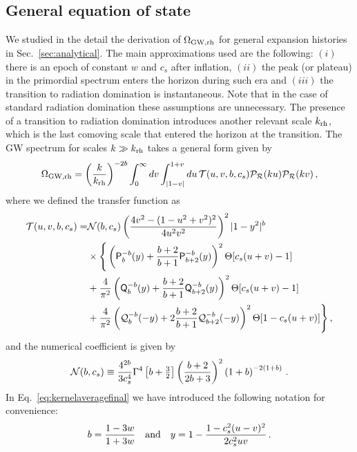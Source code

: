 \documentclass[a4paper,11pt]{article}
\numberwithin{equation}{section}
\begin{document}
\subsection{General equation of state \label{sec:generaleos}}

We studied in the detail the derivation of $\Omega_{\rm GW,rh}$ for general expansion histories in Sec.~\ref{sec:analytical}. The main approximations used are the following: $(i)$ there is an epoch of constant $w$ and $c_s$ after inflation, $(ii)$ the peak (or plateau) in the primordial spectrum enters the horizon during such era and $(iii)$ the transition to radiation domination is instantaneous. Note that in the case of standard radiation domination these assumptions are unnecessary. The presence of a transition to radiation domination introduces another relevant scale $k_{\rm rh}$, which is the last comoving scale that entered the horizon at the transition. The GW spectrum for scales $k\gg k_{\rm rh}$ takes a general form given by
\begin{equation}\label{eq:Phgaussianfinal}
\Omega_{\rm GW,rh}=\left(\frac{k}{k_{\rm rh}}\right)^{-2b}\int_0^\infty dv\int_{|1-v|}^{1+v}du\,{\cal T}(u,v,b,c_s){{\cal P}_{\cal R}(ku)}{{\cal P}_{\cal R}(kv)}\,,
\end{equation}
where we defined the transfer function as
\begin{align}\label{eq:kernelaveragefinal}
{\cal T}(u,v,b,c_s)=& {\cal N}(b,c_s)\left(\frac{4v^2-(1-u^2+v^2)^2}{4u^2v^2}\right)^2{|1-y^2|^{b}}\nonumber\\&
\times\Bigg\{\left(\mathsf{P}^{-b}_{b}(y)+\frac{b+2}{b+1}\mathsf{P}^{-b}_{b+2}(y)\right)^2\Theta[c_s(u+v)-1]\nonumber\\&
+\frac{4}{\pi^2}\left(\mathsf{Q}^{-b}_{b}(y)+\frac{b+2}{b+1}\mathsf{Q}^{-b}_{b+2}(y)\right)^2\Theta[c_s(u+v)-1]\nonumber\\&
+\frac{4}{\pi^2}\left({\cal Q}^{-b}_{b}(-y)+2\frac{b+2}{b+1}\mathsf{\cal Q}^{-b}_{b+2}(-y)\right)^2\Theta[1-c_s(u+v)]\Bigg\}\,,
\end{align}
and the numerical coefficient is given by
\begin{align}
{\cal N}(b,c_s)\equiv \frac{4^{2b}}{3c_s^4}\Gamma^4\left[b+\tfrac{3}{2}\right]\left(\frac{b+2}{2b+3}\right)^2\left(1+b\right)^{-2(1+b)}\,.
\end{align}
In Eq.~\eqref{eq:kernelaveragefinal} we have introduced the following notation for convenience:
\begin{equation}\label{eq:y2}
b=\frac{1-3w}{1+3w}\quad{\rm and}\quad y=1-\frac{1-c_s^2(u-v)^2}{2c_s^2 uv}\,.
\end{equation}
\end{document}
